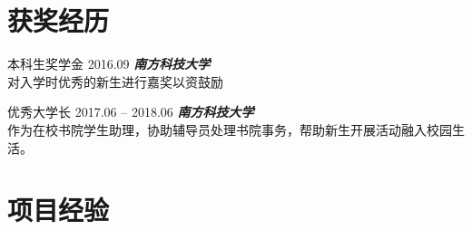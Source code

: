 \documentclass[hidelinks__VERSION__]{adamyi-cv}
\begin{document}

\section{\heir 获奖\heir 经历}

\begin{entrylist}


\entry
{\heir 本科生奖学金}
{2016.09}
{\hei \emph{\textbf{\hei 南方科技大学}}\\
对入学时优秀的新生进行嘉奖以资鼓励
}


\entry
{\heir 优秀大学长}
{2017.06 -- 2018.06}
{\hei \emph{\textbf{\hei 南方科技大学}}\\
作为在校书院学生助理，协助辅导员处理书院事务，帮助新生开展活动融入校园生活。
}


\end{entrylist}

\pagebreak



\section{\heir 项目\heir 经验}
\end{document}
